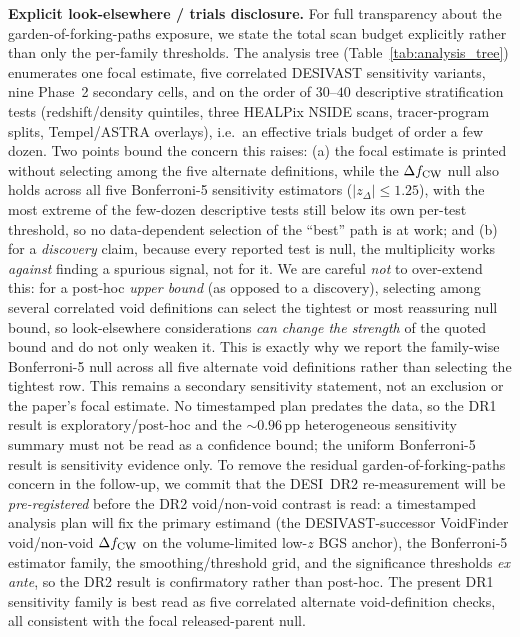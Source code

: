 \documentclass[twocolumn,linenumbers]{aastex702}
\begin{document}
\textbf{Explicit look-elsewhere / trials disclosure.} For full
transparency about the garden-of-forking-paths exposure, we state the
total scan budget explicitly rather than only the per-family thresholds.
The analysis tree (Table~\ref{tab:analysis_tree}) enumerates one focal
estimate, five correlated DESIVAST sensitivity variants, nine Phase~2
secondary cells, and on the order
of $30$--$40$ descriptive stratification tests (redshift/density
quintiles, three HEALPix NSIDE scans, tracer-program splits, Tempel/ASTRA
overlays), i.e.\ an effective trials budget of order a few dozen. Two
points bound the concern this raises: (a) the focal estimate is printed
without selecting among the five alternate definitions, while the
$\Delta f_{\rm CW}$ null also holds across all five Bonferroni-5
sensitivity estimators ($|z_\Delta|\!\le\!1.25$), with the most extreme of the few-dozen
descriptive tests still below its own per-test threshold, so no
data-dependent selection of the ``best'' path is at work; and (b) for a
\emph{discovery} claim, because every reported test is null, the
multiplicity works \emph{against} finding a spurious signal, not for it.
We are careful \emph{not} to over-extend this: for a post-hoc
\emph{upper bound} (as opposed to a discovery), selecting among several
correlated void definitions can select the tightest or most reassuring
null bound, so look-elsewhere considerations \emph{can change the
strength} of the quoted bound and do not only weaken it. This is exactly
why we report the family-wise Bonferroni-5 null across all five alternate
void definitions rather than selecting the tightest row. This remains a
secondary sensitivity statement, not an exclusion or the paper's focal
estimate. No timestamped plan predates the data, so the DR1 result is
exploratory/post-hoc and the ${\sim}0.96$\,pp heterogeneous sensitivity
summary must not be read as a confidence bound;
the uniform Bonferroni-5 result is sensitivity evidence only. To remove the residual
garden-of-forking-paths concern in the follow-up, we commit that the
DESI~DR2 re-measurement will be \emph{pre-registered} before the DR2
void/non-void contrast is read: a timestamped analysis plan will fix the
primary estimand (the DESIVAST-successor VoidFinder void/non-void
$\Delta f_{\rm CW}$ on the volume-limited low-$z$ BGS anchor), the
Bonferroni-5 estimator family, the smoothing/threshold grid, and the
significance thresholds \emph{ex ante}, so the DR2 result is confirmatory
rather than post-hoc. The present DR1 sensitivity family is best read as
five correlated alternate void-definition checks, all consistent with
the focal released-parent null.
\end{document}
